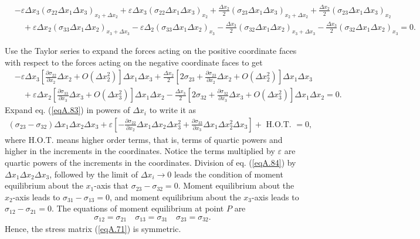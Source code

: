 \documentclass{AeroStructure-ERJohnson}
\begin{document}
\begin{align}\label{eqA.82}
&-\varepsilon \Delta x_{3}(\sigma_{22} \Delta x_{1} \Delta x_{3})_{x_{2}+\Delta x_{2}}+\varepsilon \Delta x_{3}(\sigma_{22} \Delta x_{1} \Delta x_{3})_{x_{2}}+\frac{\Delta x_{2}}{2}(\sigma_{23} \Delta x_{1} \Delta x_{3})_{x_{2}+\Delta x_{2}}+\frac{\Delta x_{2}}{2}(\sigma_{23} \Delta x_{1} \Delta x_{3})_{x_{2}}\nonumber\\
&\quad+\varepsilon \Delta x_{2}(\sigma_{33} \Delta x_{1} \Delta x_{2})_{x_{3}+\Delta x_{3}}-\varepsilon \Delta_{2}(\sigma_{33} \Delta x_{1} \Delta x_{2})_{x_{3}}-\frac{\Delta x_{3}}{2}(\sigma_{32} \Delta x_{1} \Delta x_{2})_{x_{3}+\Delta x_{3}}-\frac{\Delta x_{3}}{2}(\sigma_{32} \Delta x_{1} \Delta x_{2})_{x_{3}}=0.
\end{align}

\pagebreak
\noindent Use the Taylor series to expand the forces acting on the positive coordinate faces with respect to the forces acting on the negative coordinate faces to get
\begin{align}\label{eqA.83}
&-\varepsilon \Delta x_{3}\left[\frac{\partial \sigma_{22}}{\partial x_{2}} \Delta x_{2}+O(\Delta x_{2}^{2})\right] \Delta x_{1} \Delta x_{3}+\frac{\Delta x_{2}}{2}\left[2 \sigma_{23}+\frac{\partial \sigma_{23}}{\partial x_{2}} \Delta x_{2}+O(\Delta x_{2}^{2})\right] \Delta x_{1} \Delta x_{3}\nonumber\\
&\quad+\varepsilon \Delta x_{2}\left[\frac{\partial \sigma_{33}}{\partial x_{3}} \Delta x_{3}+O(\Delta x_{3}^{2})\right] \Delta x_{1} \Delta x_{2}-\frac{\Delta x_{3}}{2}\left[2 \sigma_{32}+\frac{\partial \sigma_{32}}{\partial x_{3}} \Delta x_{3}+O(\Delta x_{3}^{2})\right] \Delta x_{1} \Delta x_{2}=0.
\end{align}
Expand eq. (\ref{eqA.83}) in powers of $\Delta x_{i}$ to write it as
\begin{align}\label{eqA.84}
\left(\sigma_{23}-\sigma_{32}\right) \Delta x_{1} \Delta x_{2} \Delta x_{3}+\varepsilon\left[-\frac{\partial \sigma_{22}}{\partial x_{2}} \Delta x_{1} \Delta x_{2} \Delta x_{3}^{2}+\frac{\partial \sigma_{33}}{\partial x_{3}} \Delta x_{1} \Delta x_{2}^{2} \Delta x_{3}\right]+\text { H.O.T. }=0,
\end{align}
where H.O.T. means higher order terms, that is, terms of quartic powers and higher in the increments in the coordinates. Notice the terms multiplied by $\varepsilon$ are quartic powers of the increments in the coordinates. Division of eq. (\ref{eqA.84}) by $\Delta x_{1} \Delta x_{2} \Delta x_{3}$, followed by the limit of $\Delta x_{i} \rightarrow 0$ leads the condition of moment equilibrium about the $x_{1}$-axis that $\sigma_{23}-\sigma_{32}=0$. Moment equilibrium about the $x_{2}$-axis leads to $\sigma_{31}-\sigma_{13}=0$, and moment equilibrium about the $x_{3}$-axis leads to $\sigma_{12}-\sigma_{21}=0$. The equations of moment equilibrium at point $P$ are
\begin{align}\label{eqA.85}
\sigma_{12}=\sigma_{21} \quad \sigma_{13}=\sigma_{31} \quad \sigma_{23}=\sigma_{32}.
\end{align}
Hence, the stress matrix (\ref{eqA.71}) is symmetric.
\end{document}
